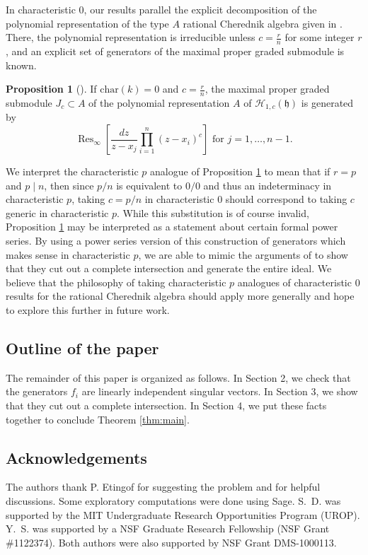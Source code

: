 \documentclass{elsarticle}
\numberwithin{equation}{section}
\theoremstyle{definition}
\newtheorem{proposition}[theorem]{Proposition}
\newcommand{\Res}{\operatorname{Res}}
\newcommand{\h}{\mathfrak{h}}
\newcommand{\HH}{\mathcal{H}}
\renewcommand{\char}{\text{char}}
\begin{document}
In characteristic $0$, our results parallel the explicit decomposition of the polynomial representation of the type $A$ rational Cherednik algebra given in \cite{BEG, CE}.  There, the polynomial representation is irreducible unless $c = \frac{r}{n}$ for some integer $r$, and an explicit set of generators of the maximal proper graded submodule is known.
\begin{proposition}[{\cite[Proposition 3.1]{CE}}] \label{prop:ce}
If $\char(k) = 0$ and $c = \frac{r}{n}$, the maximal proper graded submodule $J_c \subset A$ of the polynomial representation $A$ of $\HH_{1,c}(\h)$ is generated by
\[
\Res_\infty\left[\frac{dz}{z-x_j} \prod_{i=1}^{n} (z-x_i)^c\right] \text{ for $j=1,\dots,n-1$}.
\]
\end{proposition}
We interpret the characteristic $p$ analogue of Proposition \ref{prop:ce} to mean that if $r = p$ and $p \mid n$, then since $p/n$ is equivalent to $0/0$ and thus an indeterminacy in characteristic $p$, taking $c=p/n$ in characteristic $0$ should correspond to taking $c$ generic in characteristic $p$.  While this substitution is of course invalid, Proposition \ref{prop:ce} may be interpreted as a statement about certain formal power series.  By using a power series version of this construction of generators which makes sense in characteristic $p$, we are able to mimic the arguments of \cite{BEG, CE} to show that they cut out a complete intersection and generate the entire ideal.  We believe that the philosophy of taking characteristic $p$ analogues of characteristic $0$ results for the rational Cherednik algebra should apply more generally and hope to explore this further in future work.

\subsection{Outline of the paper}

The remainder of this paper is organized as follows.  In Section 2, we check that the generators $f_i$ are linearly independent singular vectors.  In Section 3, we show that they cut out a complete intersection.  In Section 4, we put these facts together to conclude Theorem \ref{thm:main}.

\subsection{Acknowledgements} 

The authors thank P. Etingof for suggesting the problem and for helpful discussions.  Some exploratory computations were done using Sage.  S.~D. was supported by the MIT Undergraduate Research Opportunities Program (UROP). Y.~S. was supported by a NSF Graduate Research Fellowship (NSF Grant \#1122374).  Both authors were also supported by NSF Grant DMS-1000113.
\end{document}
